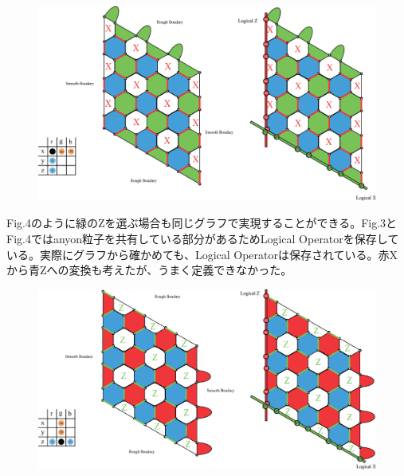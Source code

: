 \documentclass[a4paper,9pt]{ltjsarticle}
\begin{document}
  \begin{figure}[h]
    \centering
    \includegraphics[scale=0.30]{figure/figure3.eps}
    \vspace{10pt}\caption{}
    \label{figure3}
    \vspace{-15pt}
  \end{figure}
  \clearpage
  Fig.4のように緑のZを選ぶ場合も同じグラフで実現することができる。Fig.3とFig.4ではanyon粒子を共有している部分があるためLogical Operatorを保存している。実際にグラフから確かめても、Logical Operatorは保存されている。赤Xから青Zへの変換も考えたが、うまく定義できなかった。
  \begin{figure}[h]
    \centering
    \includegraphics[scale=0.30]{figure/figure4.eps}
    \vspace{10pt}\caption{}
    \label{figure4}
    \vspace{-15pt}
  \end{figure}\\
\end{document}
